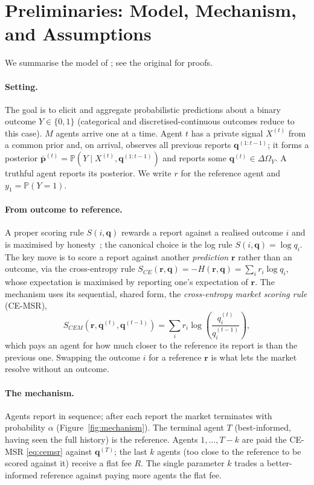 \section{Preliminaries: Model, Mechanism, and Assumptions}
\label{sec:preliminaries}

We summarise the model of \textcite{srinivasan2025selfresolving}; see the original for
proofs.

\paragraph{Setting.}
The goal is to elicit and aggregate probabilistic predictions about a binary outcome
$Y\in\{0,1\}$ (categorical and discretised-continuous outcomes reduce to this case). $M$
agents arrive one at a time. Agent $t$ has a private signal $X^{(t)}$ from a common prior
and, on arrival, observes all previous reports $\mathbf{q}^{(1:t-1)}$; it forms a posterior
$\bar{\mathbf p}^{(t)} = \mathbb{P}(Y \mid X^{(t)}, \mathbf{q}^{(1:t-1)})$ and reports some
$\mathbf{q}^{(t)} \in \Delta\Omega_Y$. A truthful agent reports its posterior. We write $r$
for the reference agent and $y_1 = \mathbb{P}(Y{=}1)$.

\paragraph{From outcome to reference.}
A proper scoring rule $S(i,\mathbf{q})$ rewards a report against a realised outcome $i$ and
is maximised by honesty~\parencite{gneiting2007strictly}; the canonical choice is the log
rule $S(i,\mathbf{q}) = \log q_i$. The key move is to score a report against another
\emph{prediction} $\mathbf{r}$ rather than an outcome, via the cross-entropy rule
$S_{CE}(\mathbf{r},\mathbf{q}) = -H(\mathbf{r},\mathbf{q}) = \sum_i r_i \log q_i$, whose
expectation is maximised by reporting one's expectation of $\mathbf{r}$. The mechanism uses
its sequential, shared form, the \emph{cross-entropy market scoring rule} (CE-MSR),
\begin{equation}
    S_{CEM}(\mathbf{r}, \mathbf{q}^{(t)}, \mathbf{q}^{(t-1)})
    = \sum_i r_i \log\!\left(\frac{q^{(t)}_i}{q^{(t-1)}_i}\right),
    \label{eq:cemsr}
\end{equation}
which pays an agent for how much closer to the reference its report is than the previous
one. Swapping the outcome $i$ for a reference $\mathbf{r}$ is what lets the market resolve
without an outcome.

\paragraph{The mechanism.}
Agents report in sequence; after each report the market terminates with probability
$\alpha$ (Figure~\ref{fig:mechanism}). The terminal agent $T$ (best-informed, having
seen the full history) is the reference. Agents $1,\dots,T-k$ are paid the CE-MSR
\eqref{eq:cemsr} against $\mathbf{q}^{(T)}$; the last $k$ agents (too close to the reference
to be scored against it) receive a flat fee $R$. The single parameter $k$ trades a
better-informed reference against paying more agents the flat fee.

